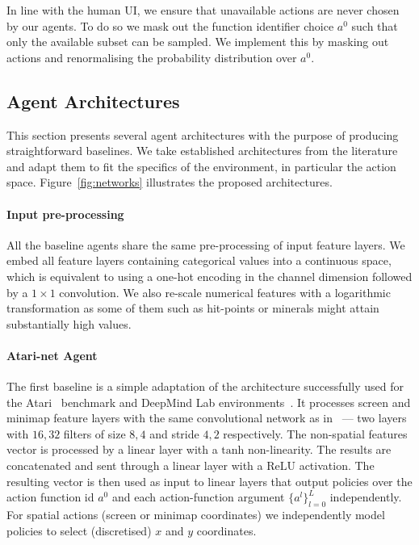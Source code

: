 In line with the human UI, we ensure that unavailable actions are never chosen by our agents. To do so we mask out the function identifier choice $a^0$ such that only the available subset can be sampled. We implement this by masking out actions and renormalising the probability distribution over $a^0$. 

\subsection{Agent Architectures}

This section presents several agent architectures with the purpose of producing straightforward baselines. We take established architectures from the literature \cite{mnih2015human, mnih2016asynchronous} and adapt them to fit the specifics of the environment, in particular the action space.
Figure~\ref{fig:networks} illustrates the proposed architectures.

\paragraph{Input pre-processing} All the baseline agents share the same pre-processing of input feature layers. We embed all feature layers containing categorical values into a continuous space, which is equivalent to using a one-hot encoding in the channel dimension followed by a $1 \times 1$ convolution. We also re-scale numerical features with a logarithmic transformation as some of them such as hit-points or minerals might attain substantially high values.

\paragraph{Atari-net Agent} The first baseline is a simple adaptation of the architecture successfully used for the Atari~\cite{bellemare2013arcade} benchmark and DeepMind Lab environments~\cite{Beattie:2016}. It processes screen and minimap feature layers with the same convolutional network as in~\cite{mnih2016asynchronous} --- two layers with $16,32$ filters of size $8,4$ and stride $4,2$ respectively. The non-spatial features vector is processed by a linear layer with a $\textrm{tanh}$ non-linearity. The results are concatenated and sent through a linear layer with a $\textrm{ReLU}$ activation. The resulting vector is then used as input to linear layers that output policies over the action function id $a^0$ and each action-function argument $\{a^l\}_{l=0}^L$ independently. For spatial actions (screen or minimap coordinates) we independently model policies to select (discretised) $x$ and $y$ coordinates.

